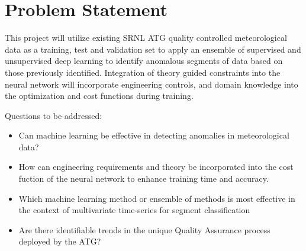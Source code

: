 \section{Problem Statement}
\label{sec:problem}

This project will utilize existing SRNL ATG quality controlled meteorological data as a training, test and validation set to apply an ensemble of supervised and unsupervised deep learning to identify anomalous segments of data based on those previously identified.  Integration of theory guided constraints into the neural network will incorporate engineering controls, and domain knowledge into the optimization and cost functions during training.

Questions to be addressed:

\begin{itemize}
    \item Can machine learning be effective in detecting anomalies in meteorological data?
    \item How can engineering requirements and theory be incorporated into the cost fuction of the neural network to enhance training time and accuracy.
    \item Which machine learning method or ensemble of methods is most effective in the context of multivariate time-series for segment classification
    \item Are there identifiable trends in the unique Quality Assurance process deployed by the ATG?
\end{itemize}

